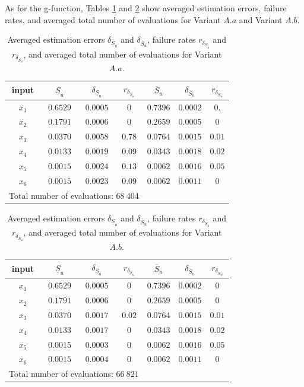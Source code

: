 As for the g-function, Tables \ref{res.bratley.Aa} and \ref{res.bratley.Ab} show averaged estimation errors, failure rates, and averaged total number of evaluations for Variant $A.a$ and Variant $A.b$.
\begin{table}[t]
\caption{Averaged estimation errors $\delta_{\underline{S}_u}$ and $\delta_{\overline{S}_u}$, failure rates $r_{\delta_{\underline{S}_u}}$ and $r_{\delta_{\overline{S}_u}}$, and averaged total number of evaluations for Variant $A.a$.}
\centering
\begin{tabular}{ccccccc}
\hline
 input & $\underline{S}_u$ & $\delta_{\underline{S}_u}$ & $r_{\delta_{\underline{S}_u}}$ & $\overline{S}_u$ & $\delta_{\overline{S}_u}$ &$r_{\delta_{\overline{S}_u}}$ \\ \hline
 $x_1$ & $0.6529$ &  $0.0005$ & $0$ & $0.7396$ & $0.0002$ & $0.$ \\ \hline
 $x_2$ & $0.1791$ &  $0.0006$ & $0$ & $0.2659$ & $0.0005$ & $0$ \\ \hline
 $x_3$ & $0.0370$ &  $0.0058$ & $0.78$ & $0.0764$ & $0.0015$ & $0.01$ \\ \hline
 $x_4$ & $0.0133$ &  $0.0019$ & $0.09$ & $0.0343$ & $0.0018$ & $0.02$ \\ \hline
 $x_5$ & $0.0015$ &  $0.0024$ & $0.13$ & $0.0062$ & $0.0016$ & $0.05$ \\ \hline
 $x_6$ & $0.0015$ & $0.0023$ & $0.09$  & $0.0062$ & $0.0011$ & $0$ \\ \hline \hline
\multicolumn{4}{l}{Total number of evaluations: $68 \ 404$} & & &\\ \hline 
\end{tabular}
\label{res.bratley.Aa}
\end{table}
\begin{table}[t]
\caption{Averaged estimation errors $\delta_{\underline{S}_u}$ and $\delta_{\overline{S}_u}$, failure rates $r_{\delta_{\underline{S}_u}}$ and $r_{\delta_{\overline{S}_u}}$, and averaged total number of evaluations for Variant $A.b$.}
\centering
\begin{tabular}{ccccccc}
\hline
 input & $\underline{S}_u$ & $\delta_{\underline{S}_u}$ & $r_{\delta_{\underline{S}_u}}$ & $\overline{S}_u$ & $\delta_{\overline{S}_u}$ & $r_{\delta_{\overline{S}_u}}$ \\ \hline
 $x_1$ & $0.6529$ &  $0.0005$ & $0$ & $0.7396$ & $0.0002$ & $0$ \\ \hline
 $x_2$ & $0.1791$ &  $0.0006$ & $0$ & $0.2659$ & $0.0005$ & $0$ \\ \hline
 $x_3$ & $0.0370$ &  $0.0017$ & $0.02$ & $0.0764$ & $0.0015$ & $0.01$ \\ \hline
 $x_4$ & $0.0133$ &  $0.0017$ & $0$ & $0.0343$ & $0.0018$ & $0.02$ \\ \hline
 $x_5$ & $0.0015$ &  $0.0003$ & $0$ & $0.0062$ & $0.0016$ & $0.05$ \\ \hline
 $x_6$ & $0.0015$ &  $0.0004$ & $0$  & $0.0062$ & $0.0011$ & $0$ \\ \hline \hline
\multicolumn{4}{l}{Total number of evaluations: $66 \ 821$} & & &\\ \hline 
\end{tabular}
\label{res.bratley.Ab}
\end{table}

